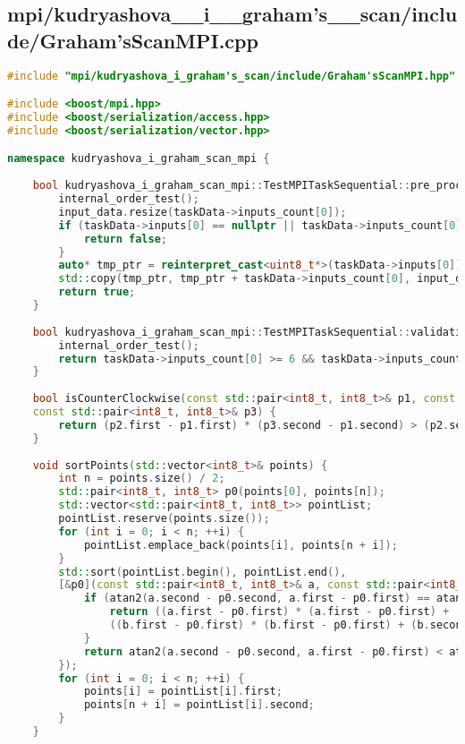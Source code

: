 \documentclass[a4paper,12pt]{article}
\begin{document}
\subsection*{mpi/kudryashova\_\_i\_\_graham's\_\_scan/include/Graham'sScanMPI.cpp}
\begin{lstlisting}[language=C++]
#include "mpi/kudryashova_i_graham's_scan/include/Graham'sScanMPI.hpp"

#include <boost/mpi.hpp>
#include <boost/serialization/access.hpp>
#include <boost/serialization/vector.hpp>

namespace kudryashova_i_graham_scan_mpi {
	
	bool kudryashova_i_graham_scan_mpi::TestMPITaskSequential::pre_processing() {
		internal_order_test();
		input_data.resize(taskData->inputs_count[0]);
		if (taskData->inputs[0] == nullptr || taskData->inputs_count[0] == 0) {
			return false;
		}
		auto* tmp_ptr = reinterpret_cast<uint8_t*>(taskData->inputs[0]);
		std::copy(tmp_ptr, tmp_ptr + taskData->inputs_count[0], input_data.begin());
		return true;
	}
	
	bool kudryashova_i_graham_scan_mpi::TestMPITaskSequential::validation() {
		internal_order_test();
		return taskData->inputs_count[0] >= 6 && taskData->inputs_count[0] % 2 == 0;
	}
	
	bool isCounterClockwise(const std::pair<int8_t, int8_t>& p1, const std::pair<int8_t, int8_t>& p2,
	const std::pair<int8_t, int8_t>& p3) {
		return (p2.first - p1.first) * (p3.second - p1.second) > (p2.second - p1.second) * (p3.first - p1.first);
	}
	
	void sortPoints(std::vector<int8_t>& points) {
		int n = points.size() / 2;
		std::pair<int8_t, int8_t> p0(points[0], points[n]);
		std::vector<std::pair<int8_t, int8_t>> pointList;
		pointList.reserve(points.size());
		for (int i = 0; i < n; ++i) {
			pointList.emplace_back(points[i], points[n + i]);
		}
		std::sort(pointList.begin(), pointList.end(),
		[&p0](const std::pair<int8_t, int8_t>& a, const std::pair<int8_t, int8_t>& b) {
			if (atan2(a.second - p0.second, a.first - p0.first) == atan2(b.second - p0.second, b.first - p0.first)) {
				return ((a.first - p0.first) * (a.first - p0.first) + (a.second - p0.second) * (a.second - p0.second)) <
				((b.first - p0.first) * (b.first - p0.first) + (b.second - p0.second) * (b.second - p0.second));
			}
			return atan2(a.second - p0.second, a.first - p0.first) < atan2(b.second - p0.second, b.first - p0.first);
		});
		for (int i = 0; i < n; ++i) {
			points[i] = pointList[i].first;
			points[n + i] = pointList[i].second;
		}
	}
	

\end{lstlisting}
\end{document}
